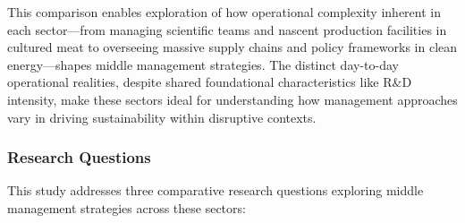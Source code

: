 	This comparison enables exploration of how operational complexity inherent in each sector—from managing scientific teams and nascent production facilities in cultured meat to overseeing massive supply chains and policy frameworks in clean energy—shapes middle management strategies. The distinct day-to-day operational realities, despite shared foundational characteristics like R\&D intensity, make these sectors ideal for understanding how management approaches vary in driving sustainability within disruptive contexts. \\
	
	\subsubsection{Research Questions}
	This study addresses three comparative research questions exploring middle management strategies across these sectors:
